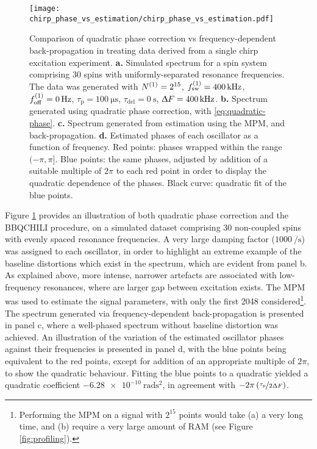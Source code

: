 \begin{figure}
    \centering
    \texttt{[image: chirp\_phase\_vs\_estimation/chirp\_phase\_vs\_estimation.pdf]}
    \caption[
        Comparison of quadratic phase correction vs frequency-dependent
        back-propagation in treating data derived from a single-chirp
        excitation experiment.
    ]
    {
        Comparison of quadratic phase correction vs frequency-dependent
        back-propagation in treating data derived from a single chirp
        excitation experiment.
        \textbf{a.} Simulated spectrum for a spin system comprising 30 spins
        with uniformly-separated resonance frequencies. The data was generated
        with
        $N^{(1)}=2^{15}$,
        $f_{\mathrm{sw}}^{(1)}=\qty{400}{\kilo\hertz}$,
        $f_{\mathrm{off}}^{(1)}=\qty{0}{\hertz}$,
        $\tau_{\text{p}} = \qty{100}{\micro\second}$,
        $\tau_{\text{del}} = \qty{0}{\second}$,
        $\Updelta F = \qty{400}{\kilo\hertz}$.
        \textbf{b.} Spectrum generated using quadratic phase correction, with
        \eqref{eq:quadratic-phase}.
        \textbf{c.} Spectrum generated from estimation using the \ac{MPM}, and
        back-propagation.
        \textbf{d.} Estimated phases of each oscillator as a function of
        frequency. Red points: phases wrapped within the range $(-\pi, \pi]$.
        Blue points: the same phases, adjusted by addition of a suitable multiple
        of $2 \pi$ to each red point in order to display the quadratic
        dependence of the phases. Black curve: quadratic fit of the blue
        points.
    }
    \label{fig:chirp-phase-vs-backprop}
\end{figure}
Figure \ref{fig:chirp-phase-vs-backprop} provides an illustration of both
quadratic phase correction and the \ac{BBQCHILI} procedure, on a simulated
dataset comprising 30 non-coupled spins with evenly spaced resonance
frequencies. A very large damping factor ($\qty{1000}{\per\second}$) was
assigned to each oscillator, in order to highlight an extreme example of the
baseline distortions which exist in the spectrum, which are evident from panel
b. As explained above, more intense, narrower artefacts are associated with
low-frequency resonances, where are larger gap between excitation exists. The
\ac{MPM} was used to estimate the signal parameters, with only the first 2048
considered\footnote{
    Performing the \ac{MPM} on a signal with $2^{15}$ points would take (a) a
    very long time, and (b) require a very large amount of \ac{RAM} (see Figure
    \ref{fig:profiling}).
}. The spectrum generated via frequency-dependent back-propagation is presented
in panel c, where a well-phased spectrum without baseline distortion was
achieved. An illustration of the variation of the estimated oscillator phases
against their frequencies is presented in panel d, with the blue points being
equivalent to the red points, except for addition of an appropriate multiple
of $2\pi$, to show the quadratic behaviour. Fitting the blue points to a
quadratic yielded a quadratic coefficient
$\qty{-6.28e-10}{\radian\second\squared}$, in agreement with $-2 \pi
\left(\nicefrac{\tau_{\text{p}}}{2 \Updelta F}\right)$.
